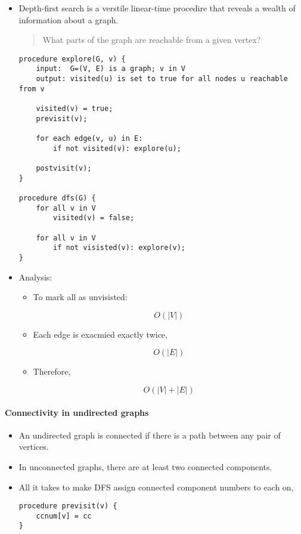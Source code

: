 \documentclass[a4paper,11pt]{article}
\begin{document}
\begin{itemize}
\item
  Depth-first search is a verstile linear-time procedire that reveals a
  wealth of information about a graph.

  \begin{quote}
  What parts of the graph are reachable from a given vertex?
  \end{quote}

\begin{verbatim}
procedure explore(G, v) {
    input:  G=(V, E) is a graph; v in V
    output: visited(u) is set to true for all nodes u reachable from v

    visited(v) = true;
    previsit(v);

    for each edge(v, u) in E:
        if not visited(v): explore(u);

    postvisit(v);
}

procedure dfs(G) {
    for all v in V
        visited(v) = false;

    for all v in V
        if not visisted(v): explore(v);
}
\end{verbatim}
\item
  Analysis:

  \begin{itemize}
  \item
    To mark all as unvisisted:

    \[O(|V|)\]
  \item
    Each edge is exacmied exactly twice,

    \[O(|E|)\]
  \item
    Therefore,

    \[O(|V| + |E|)\]
  \end{itemize}
\end{itemize}

\paragraph{Connectivity in undirected
graphs}\label{connectivity-in-undirected-graphs}

\begin{itemize}
\item
  An undirected graph is connected if there is a path between any pair
  of vertices.
\item
  In unconnected graphs, there are at least two connected components.
\item
  All it takes to make DFS assign connected component numbers to each
  on,

\begin{verbatim}
procedure previsit(v) {
    ccnum[v] = cc
}
\end{verbatim}
\end{itemize}
\end{document}
